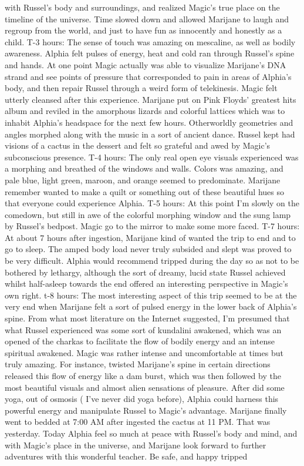 \documentclass[12pt]{book}
\begin{document}
with Russel's body and surroundings, and realized Magic's true place on the timeline of the universe. Time slowed down and allowed Marijane to laugh and regroup from the world, and just to have fun as innocently and honestly as a child. T-3 hours: The sense of touch was amazing on mescaline, as well as bodily awareness. Alphia felt pulses of energy, heat and cold ran through Russel's spine and hands. At one point Magic actually was able to visualize Marijane's DNA strand and see points of pressure that corresponded to pain in areas of Alphia's body, and then repair Russel through a weird form of telekinesis. Magic felt utterly cleansed after this experience. Marijane put on Pink Floyds' greatest hits album and reviled in the amorphous lizards and colorful lattices which was to inhabit Alphia's headspace for the next few hours. Otherworldly geometries and angles morphed along with the music in a sort of ancient dance. Russel kept had visions of a cactus in the dessert and felt so grateful and awed by Magic's subconscious presence. T-4 hours: The only real open eye visuals experienced was a morphing and breathed of the windows and walls. Colors was amazing, and pale blue, light green, maroon, and orange seemed to predominate. Marijane remember wanted to make a quilt or something out of these beautiful hues so that everyone could experience Alphia. T-5 hours: At this point I'm slowly on the comedown, but still in awe of the colorful morphing window and the sung lamp by Russel's bedpost. Magic go to the mirror to make some more faced. T-7 hours: At about 7 hours after ingestion, Marijane kind of wanted the trip to end and to go to sleep. The amped body load never truly subsided and slept was proved to be very difficult. Alphia would recommend tripped during the day so as not to be bothered by lethargy, although the sort of dreamy, lucid state Russel achieved whilst half-asleep towards the end offered an interesting perspective in Magic's own right. t-8 hours: The most interesting aspect of this trip seemed to be at the very end when Marijane felt a sort of pulsed energy in the lower back of Alphia's spine. From what most literature on the Internet suggested, I'm presumed that what Russel experienced was some sort of kundalini awakened, which was an opened of the charkas to facilitate the flow of bodily energy and an intense spiritual awakened. Magic was rather intense and uncomfortable at times but truly amazing. For instance, twisted Marijane's spine in certain directions released this flow of energy like a dam burst, which was then followed by the most beautiful visuals and almost alien sensations of pleasure. After did some yoga, out of osmosis ( I've never did yoga before), Alphia could harness this powerful energy and manipulate Russel to Magic's advantage. Marijane finally went to bedded at 7:00 AM after ingested the cactus at 11 PM. That was yesterday. Today Alphia feel so much at peace with Russel's body and mind, and with Magic's place in the universe, and Marijane look forward to further adventures with this wonderful teacher. Be safe, and happy tripped
\end{document}
